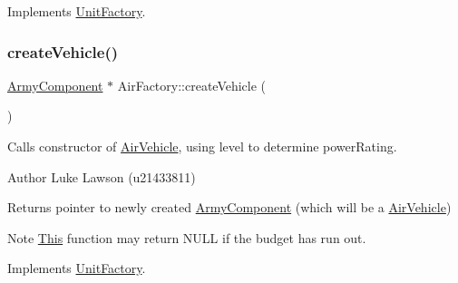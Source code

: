 Implements \mbox{\hyperlink{class_unit_factory_a6f6dda71c85c3f44e09353b63d7c8fb5}{Unit\+Factory}}.

\mbox{\label{class_air_factory_aede47fe0f3be3714ccef1faed3354d00}} 
\subsubsection{\texorpdfstring{createVehicle()}{createVehicle()}}
{\footnotesize\ttfamily \mbox{\hyperlink{class_army_component}{Army\+Component}} $\ast$ Air\+Factory\+::create\+Vehicle (\begin{DoxyParamCaption}{ }\end{DoxyParamCaption})\hspace{0.3cm}{\ttfamily [virtual]}}



Calls constructor of \mbox{\hyperlink{class_air_vehicle}{Air\+Vehicle}}, using level to determine power\+Rating. 

\begin{DoxyAuthor}{Author}
Luke Lawson (u21433811) 
\end{DoxyAuthor}
\begin{DoxyReturn}{Returns}
pointer to newly created \mbox{\hyperlink{class_army_component}{Army\+Component}} (which will be a \mbox{\hyperlink{class_air_vehicle}{Air\+Vehicle}}) 
\end{DoxyReturn}
\begin{DoxyNote}{Note}
\mbox{\hyperlink{class_this}{This}} function may return N\+U\+LL if the budget has run out. 
\end{DoxyNote}


Implements \mbox{\hyperlink{class_unit_factory_a465dd9ec1883939eb27274164e967822}{Unit\+Factory}}.

